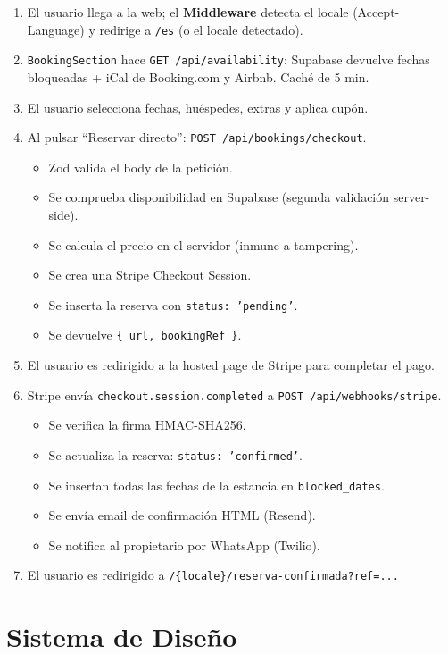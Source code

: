 \documentclass[12pt,a4paper,twoside,openright]{report}
\begin{document}
\begin{enumerate}
  \item El usuario llega a la web; el \textbf{Middleware} detecta el locale (Accept-Language) y redirige a \texttt{/es} (o el locale detectado).
  \item \texttt{BookingSection} hace \texttt{GET /api/availability}: Supabase devuelve fechas bloqueadas + iCal de Booking.com y Airbnb. Caché de 5 min.
  \item El usuario selecciona fechas, huéspedes, extras y aplica cupón.
  \item Al pulsar ``Reservar directo'': \texttt{POST /api/bookings/checkout}.
  \begin{itemize}
    \item Zod valida el body de la petición.
    \item Se comprueba disponibilidad en Supabase (segunda validación server-side).
    \item Se calcula el precio en el servidor (inmune a tampering).
    \item Se crea una Stripe Checkout Session.
    \item Se inserta la reserva con \texttt{status: 'pending'}.
    \item Se devuelve \texttt{\{ url, bookingRef \}}.
  \end{itemize}
  \item El usuario es redirigido a la hosted page de Stripe para completar el pago.
  \item Stripe envía \texttt{checkout.session.completed} a \texttt{POST /api/webhooks/stripe}.
  \begin{itemize}
    \item Se verifica la firma HMAC-SHA256.
    \item Se actualiza la reserva: \texttt{status: 'confirmed'}.
    \item Se insertan todas las fechas de la estancia en \texttt{blocked\_dates}.
    \item Se envía email de confirmación HTML (Resend).
    \item Se notifica al propietario por WhatsApp (Twilio).
  \end{itemize}
  \item El usuario es redirigido a \texttt{/\{locale\}/reserva-confirmada?ref=...}
\end{enumerate}

\chapter{Sistema de Diseño}
\end{document}
